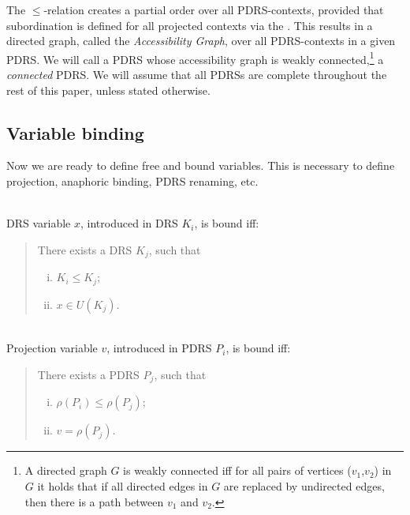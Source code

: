 The $\leq$-relation creates a partial order over all PDRS-contexts, provided
that subordination is defined for all projected contexts via the \MAPs. This
results in a directed graph, called the \textit{Accessibility Graph}, over
all PDRS-contexts in a given PDRS. We will call a PDRS whose accessibility
graph is weakly connected,\footnote{A directed graph $G$ is weakly connected
  iff for all pairs of vertices ($v_1$,$v_2$) in $G$ it holds that if all
  directed edges in $G$ are replaced by undirected edges, then there is
a path between $v_1$ and $v_2$.} a \emph{connected} PDRS. We will assume
that all PDRSs are complete throughout the rest of this paper, unless stated
otherwise.


\subsection{Variable binding}

Now we are ready to define free and bound variables.  This is necessary to
define projection, anaphoric binding, PDRS renaming, etc.

\begin{definition}~\\
DRS variable $x$, introduced in DRS $K_i$, is bound iff:
\begin{quote}
There exists a DRS $K_j$, such that
\begin{enumerate}[i.]
  \item $K_i \leq K_j$;
  \item $x\in U(K_j)$. %
\end{enumerate}
\end{quote}
\end{definition}

\begin{definition}~\\
Projection variable $v$, introduced in PDRS $P_i$, is bound iff:
\begin{quote}
There exists a PDRS $P_j$, such that
\begin{enumerate}[i.]
  \item $\rho(P_i) \leq \rho(P_j)$; %
  \item $v = \rho(P_j)$.
\end{enumerate}
\end{quote}
\end{definition}

